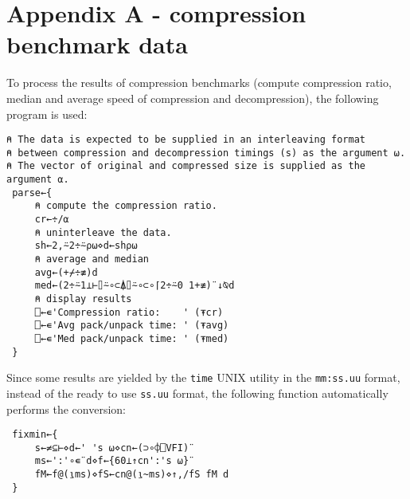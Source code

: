 
\chapter*{Appendix A - compression benchmark data}

\par To process the results of compression benchmarks (compute compression ratio, median and average speed of compression and decompression), the following program is used:

\begin{verbatim}
⍝ The data is expected to be supplied in an interleaving format
⍝ between compression and decompression timings (s) as the argument ⍵.
⍝ The vector of original and compressed size is supplied as the argument ⍺.
 parse←{
     ⍝ compute the compression ratio.
     cr←÷/⍺
     ⍝ uninterleave the data.
     sh←2,⍨2÷⍨⍴⍵⋄d←sh⍴⍵
     ⍝ average and median
     avg←(+⌿÷≢)d
     med←(2÷⍨1⊥⊢⌷⍨∘⊂⍋⌷⍨∘⊂∘⌈2÷⍨0 1+≢)¨↓⍉d
     ⍝ display results
     ⎕←∊'Compression ratio:    ' (⍕cr)
     ⎕←∊'Avg pack/unpack time: ' (⍕avg)
     ⎕←∊'Med pack/unpack time: ' (⍕med)
 }
\end{verbatim}

\par Since some results are yielded by the \verb|time| UNIX utility in the \verb|mm:ss.uu| format, instead of the ready to use \verb|ss.uu| format, the following function automatically performs the conversion:

\begin{verbatim}
 fixmin←{
     s←≠⊆⊢⋄d←' 's ⍵⋄cn←(⊃∘⌽⎕VFI)¨
     ms←':'∘∊¨d⋄f←{60⊥↑cn':'s ⍵}¨
     fM←f@(⍸ms)⋄fS←cn@(⍸~ms)⋄↑,/fS fM d
 }
\end{verbatim}

